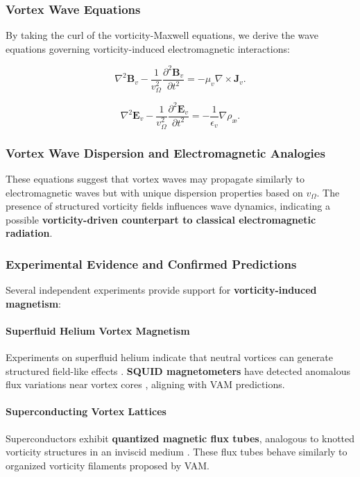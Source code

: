 \subsubsection*{Vortex Wave Equations}
By taking the curl of the vorticity-Maxwell equations, we derive the wave equations governing vorticity-induced electromagnetic interactions:

\begin{equation*}
    \nabla^2 \boldsymbol{B}_v - \frac{1}{v_\Omega^2} \frac{\partial^2 \boldsymbol{B}_v}{\partial t^2} = -\mu_v \nabla \times \boldsymbol{J}_v.
\end{equation*}

\begin{equation*}
    \nabla^2 \boldsymbol{E}_v - \frac{1}{v_\Omega^2} \frac{\partial^2 \boldsymbol{E}_v}{\partial t^2} = -\frac{1}{\epsilon_v} \nabla \rho_{\text{æ}}.
\end{equation*}

\subsubsection*{Vortex Wave Dispersion and Electromagnetic Analogies}
These equations suggest that vortex waves may propagate similarly to electromagnetic waves but with unique dispersion properties based on \( v_\Omega \). The presence of structured vorticity fields influences wave dynamics, indicating a possible \textbf{vorticity-driven counterpart to classical electromagnetic radiation}.

\subsubsection*{Experimental Evidence and Confirmed Predictions}
Several independent experiments provide support for \textbf{vorticity-induced magnetism}:

\paragraph{Superfluid Helium Vortex Magnetism}
Experiments on superfluid helium indicate that neutral vortices can generate structured field-like effects \cite{superfluid_he_interferometers}. \textbf{SQUID magnetometers} have detected anomalous flux variations near vortex cores \cite{initial_vortex_magnetometers}, aligning with VAM predictions.

\paragraph{Superconducting Vortex Lattices}
Superconductors exhibit \textbf{quantized magnetic flux tubes}, analogous to knotted vorticity structures in an inviscid medium \cite{superconducting_flux_focusing}. These flux tubes behave similarly to organized vorticity filaments proposed by VAM.

